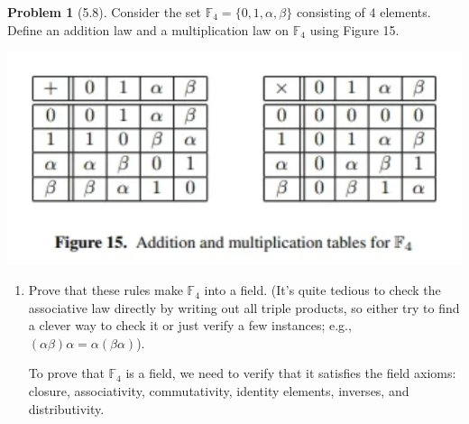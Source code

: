 \documentclass[12pt]{article}
\theoremstyle{definition}
\newtheorem{problem}{Problem}
\begin{document}
\begin{problem}[5.8]
    Consider the set $\mathbb{F}_4 = \{ 0, 1, \alpha, \beta \}$ consisting of $4$ elements.
    Define an addition law and a multiplication law on $\mathbb{F}_4$ using Figure 15.
    \begin{center}
        \includegraphics[scale=1]{figure 15.png}
    \end{center}
    \begin{enumerate}[label=(\alph*)]
        \item Prove that these rules make $\mathbb{F}_4$ into a field. (It's quite tedious to check the
              associative law directly by writing out all triple products, so either try to find a clever
              way to check it or just verify a few instances; 
              e.g., $(\alpha\beta)\alpha = \alpha(\beta\alpha)$).

              \begin{solution}
                To prove that $\mathbb{F}_4$ is a field, we need to verify that it satisfies the field axioms: closure, associativity, commutativity, identity elements, inverses, and distributivity.
    

\end{solution}
\end{enumerate}
\end{problem}
\end{document}
